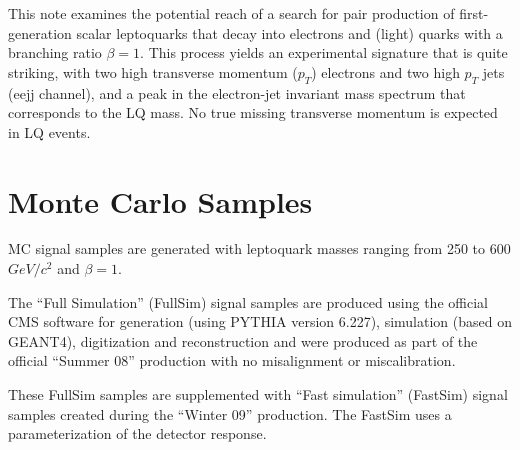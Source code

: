 \documentclass{cmspaper}
\begin{document}
\begin{linenumbers}
This note examines the potential reach of a search for
pair production of first-generation 
scalar leptoquarks that decay into electrons and 
(light) quarks with a branching ratio $\beta=1$. 
This process yields an experimental signature that
is quite striking, with two 
high transverse momentum ($p_T$) electrons 
and two high $p_T$ jets (eejj channel), and
a peak in the electron-jet invariant mass 
spectrum that corresponds to the LQ mass. 
No true missing transverse momentum is expected in LQ events.


\section{Monte Carlo Samples} \label{sec:MCSamples}
MC signal samples are generated with leptoquark masses ranging from 
250 to 600 $GeV/c^2$ and $\beta=1$. 

The ``Full Simulation'' (FullSim) signal samples are produced using 
the official CMS software for generation (using PYTHIA version 6.227), 
simulation (based on GEANT4), digitization and reconstruction 
and were produced as part of the official ``Summer 08'' 
production with no misalignment or miscalibration.

These FullSim samples are supplemented with
``Fast simulation'' (FastSim) signal samples created during the ``Winter 09'' production.
The FastSim uses a parameterization of the 
detector response.


\end{linenumbers}
\end{document}
